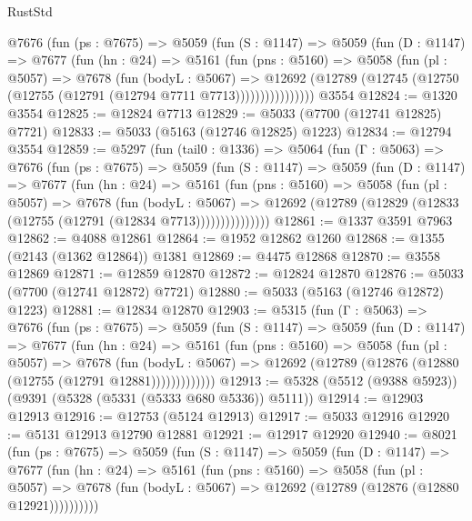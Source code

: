 \begin{lexlean}{RustStd}
\begin{coremodule}
        @7676
          (fun (ps : @7675) =>
          @5059
            (fun (S : @1147) =>
            @5059
              (fun (D : @1147) =>
              @7677
                (fun (hn : @24) =>
                @5161
                  (fun (pns : @5160) =>
                  @5058
                    (fun (pl : @5057) =>
                    @7678
                      (fun (bodyL : @5067) =>
                      @12692
                        (@12789 (@12745 (@12750 (@12755 (@12791 (@12794 @7711 @7713))))))))))))))))
    @3554
@12824 := @1320 @3554
@12825 := @12824 @7713
@12829 := @5033 (@7700 (@12741 @12825) @7721)
@12833 := @5033 (@5163 (@12746 @12825) @1223)
@12834 := @12794 @3554
@12859 := @5297
    (fun (tail0 : @1336) =>
    @5064
      (fun (Γ : @5063) =>
      @7676
        (fun (ps : @7675) =>
        @5059
          (fun (S : @1147) =>
          @5059
            (fun (D : @1147) =>
            @7677
              (fun (hn : @24) =>
              @5161
                (fun (pns : @5160) =>
                @5058
                  (fun (pl : @5057) =>
                  @7678
                    (fun (bodyL : @5067) =>
                    @12692 (@12789 (@12829 (@12833 (@12755 (@12791 (@12834 @7713)))))))))))))))
@12861 := @1337 @3591 @7963
@12862 := @4088 @12861
@12864 := @1952 @12862 @1260
@12868 := @1355 (@2143 (@1362 @12864)) @1381
@12869 := @4475 @12868
@12870 := @3558 @12869
@12871 := @12859 @12870
@12872 := @12824 @12870
@12876 := @5033 (@7700 (@12741 @12872) @7721)
@12880 := @5033 (@5163 (@12746 @12872) @1223)
@12881 := @12834 @12870
@12903 := @5315
    (fun (Γ : @5063) =>
    @7676
      (fun (ps : @7675) =>
      @5059
        (fun (S : @1147) =>
        @5059
          (fun (D : @1147) =>
          @7677
            (fun (hn : @24) =>
            @5161
              (fun (pns : @5160) =>
              @5058
                (fun (pl : @5057) =>
                @7678
                  (fun (bodyL : @5067) =>
                  @12692 (@12789 (@12876 (@12880 (@12755 (@12791 @12881)))))))))))))
@12913 := @5328 (@5512 (@9388 @5923)) (@9391 (@5328 (@5331 (@5333 @680 @5336)) @5111))
@12914 := @12903 @12913
@12916 := @12753 (@5124 @12913)
@12917 := @5033 @12916
@12920 := @5131 @12913 @12790 @12881
@12921 := @12917 @12920
@12940 := @8021
    (fun (ps : @7675) =>
    @5059
      (fun (S : @1147) =>
      @5059
        (fun (D : @1147) =>
        @7677
          (fun (hn : @24) =>
          @5161
            (fun (pns : @5160) =>
            @5058
              (fun (pl : @5057) =>
              @7678 (fun (bodyL : @5067) => @12692 (@12789 (@12876 (@12880 @12921))))))))))

\end{coremodule}
\end{lexlean}
